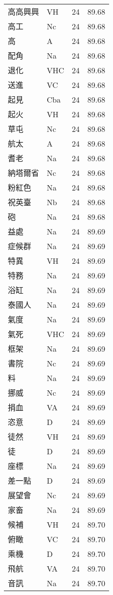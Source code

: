\documentclass[twocolumn]{book}
\begin{document}
\begin{supertabular}{llrr}
高高興興 & VH & 24 &  89.68\\
高工 & Nc & 24 &  89.68\\
高 & A & 24 &  89.68\\
配角 & Na & 24 &  89.68\\
退化 & VHC & 24 &  89.68\\
送進 & VC & 24 &  89.68\\
起見 & Cba & 24 &  89.68\\
起火 & VH & 24 &  89.68\\
草屯 & Nc & 24 &  89.68\\
航太 & A & 24 &  89.68\\
耆老 & Na & 24 &  89.68\\
納塔爾省 & Nc & 24 &  89.68\\
粉紅色 & Na & 24 &  89.68\\
祝英臺 & Nb & 24 &  89.68\\
砲 & Na & 24 &  89.68\\
益處 & Na & 24 &  89.69\\
症候群 & Na & 24 &  89.69\\
特異 & VH & 24 &  89.69\\
特務 & Na & 24 &  89.69\\
浴缸 & Na & 24 &  89.69\\
泰國人 & Na & 24 &  89.69\\
氣度 & Na & 24 &  89.69\\
氣死 & VHC & 24 &  89.69\\
框架 & Na & 24 &  89.69\\
書院 & Nc & 24 &  89.69\\
料 & Na & 24 &  89.69\\
挪威 & Nc & 24 &  89.69\\
捐血 & VA & 24 &  89.69\\
恣意 & D & 24 &  89.69\\
徒然 & VH & 24 &  89.69\\
徒 & D & 24 &  89.69\\
座標 & Na & 24 &  89.69\\
差一點 & D & 24 &  89.69\\
展望會 & Nc & 24 &  89.69\\
家畜 & Na & 24 &  89.69\\
候補 & VH & 24 &  89.70\\
俯瞰 & VC & 24 &  89.70\\
乘機 & D & 24 &  89.70\\
飛航 & VA & 24 &  89.70\\
音訊 & Na & 24 &  89.70\\

\end{supertabular}
\end{document}
